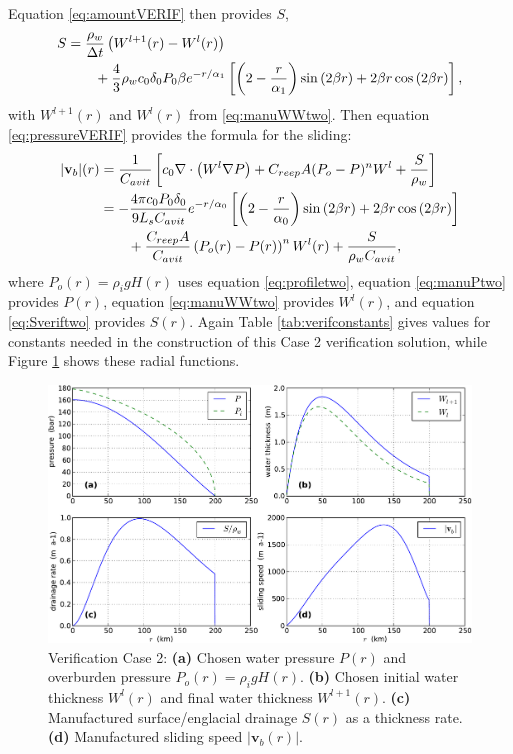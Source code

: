 \documentclass[11pt]{amsart}
\newcommand{\bv}{\mathbf{v}}
\newcommand{\Cavit}{C_{avit}}
\newcommand{\Creep}{C_{reep}}
\begin{document}
Equation \eqref{eq:amountVERIF} then provides $S$,
\begin{align}
S &= \frac{\rho_w}{\Delta t} \left(W^{l+1}(r) - W^{l}(r)\right) \label{eq:Sveriftwo} \\ 
  &\qquad + \frac{4}{3} \rho_w c_0 \delta_0 P_0 \beta e^{-r/\alpha_1} \left[\left(2 - \frac{r}{\alpha_1}\right) \sin\left(2 \beta r\right) + 2 \beta r \cos\left(2 \beta r\right)\right], \notag
\end{align}
with $W^{l+1}(r)$ and $W^{l}(r)$ from \eqref{eq:manuWWtwo}.  Then equation \eqref{eq:pressureVERIF} provides the formula for the sliding:
\begin{align}
|\bv_b|(r) &= \frac{1}{\Cavit} \left[c_0 \nabla \cdot \left(W^l \nabla P\right) + \Creep A (P_o - P)^n W^l + \frac{S}{\rho_w}\right] \label{eq:slidingveriftwo}  \\
   &= - \frac{4 \pi c_0 P_0 \delta_0}{9 L_s \Cavit} e^{-r/\alpha_0} \left[\left(2 - \frac{r}{\alpha_0}\right) \sin\left(2 \beta r\right) + 2 \beta r \cos\left(2 \beta r\right)\right] \notag \\
   &\qquad + \frac{\Creep A}{\Cavit} \left(P_o(r) - P(r)\right)^n W^l(r) + \frac{S}{\rho_w \Cavit}, \notag
\end{align}
where $P_o(r) = \rho_i g H(r)$ uses equation \eqref{eq:profiletwo}, equation \eqref{eq:manuPtwo} provides $P(r)$, equation \eqref{eq:manuWWtwo} provides $W^l(r)$, and equation \eqref{eq:Sveriftwo} provides $S(r)$.  Again Table \ref{tab:verifconstants} gives values for constants needed in the construction of this Case 2 verification solution, while Figure \ref{fig:verifcase2} shows these radial functions.

\begin{figure}[ht]
\centering
\includegraphics[width=6.2in,keepaspectratio=true]{figs/verifcase2}
\caption{Verification Case 2:  \textbf{(a)} Chosen water pressure $P(r)$ and overburden pressure $P_o(r) = \rho_i g H(r)$.  \textbf{(b)} Chosen initial water thickness $W^l(r)$ and final water thickness $W^{l+1}(r)$.  \textbf{(c)} Manufactured surface/englacial drainage $S(r)$ as a thickness rate.  \textbf{(d)} Manufactured sliding speed $|\bv_b(r)|$.}
\label{fig:verifcase2}
\end{figure}
\end{document}
